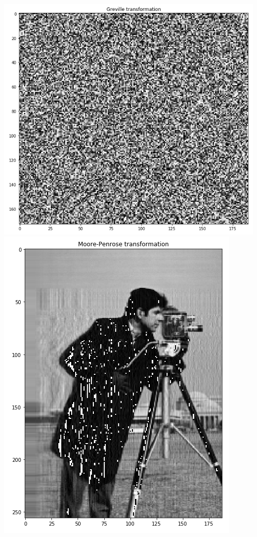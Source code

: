 \documentclass[12pt, a4paper]{article}
\begin{document}
\begin{enumerate}
  \includegraphics[scale=0.39]{Greville_2.png} \\
  \includegraphics[scale=0.39]{Moore_1.png}

\end{enumerate}
\end{document}
